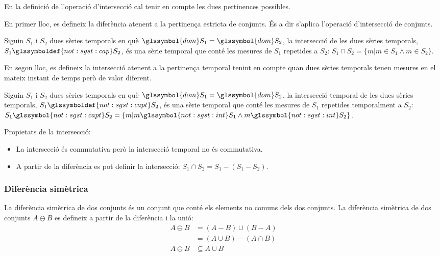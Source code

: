 En la definició de l'operació d'intersecció cal tenir en compte les
dues pertinences possibles.

En primer lloc, es defineix la diferència atenent a la pertinença
estricta de conjunts. És a dir s'aplica l'operació d'intersecció de
conjunts.
\begin{definition}[Intersecció]
  Siguin $S_1$ i $S_2$ dues sèries temporals  en què $\glssymbol{dom}
  S_1 = \glssymbol{dom} S_2$, la intersecció de les dues
  sèries temporals, $S_1 \glssymboldef{not:sgst:cap} S_2$, és una sèrie
  temporal  que conté les mesures de $S_1$
  repetides a $S_2$: $S_1 \cap S_2 = \{ m | m \in S_1 \wedge m \in S_2 \}$.
\end{definition}

En segon lloc, es defineix la intersecció atenent a la pertinença
temporal tenint en compte quan dues sèries temporals tenen mesures en
el mateix instant de temps però de valor diferent.
\begin{definition}
  Siguin $S_1$ i $S_2$ dues sèries temporals  en què $\glssymbol{dom}
  S_1 = \glssymbol{dom} S_2$, la intersecció temporal de les
  dues sèries temporals, $S_1 \glssymboldef{not:sgst:capt} S_2$, és una
  sèrie temporal que conté les mesures de
  $S_1$ repetides temporalment a $S_2$: $S_1 \glssymbol{not:sgst:capt}
  S_2 = \{ m | m \glssymbol{not:sgst:int} S_1 \wedge m \glssymbol{not:sgst:int} S_2 \}$.
\end{definition}

Propietats de la intersecció:
\begin{itemize}
\item La intersecció és commutativa però la intersecció temporal no és
  commutativa.
\item A partir de la diferència es pot definir la intersecció: $S_1
  \cap S_2 = S_1 - (S_1 - S_2)$.
\end{itemize}


\subsubsection{Diferència simètrica}

La diferència simètrica de dos conjunts és un conjunt que conté els
elements no comuns dels dos conjunts. La diferència simètrica de dos
conjunts $A \ominus B$ es defineix a partir de la diferència i la
unió:
\begin{align*}
A \ominus B  & = (A-B)\cup(B-A)\\
             & = (A\cup B)-(A\cap B)  \\
A \ominus B  & \subseteq A\cup B
\end{align*}

